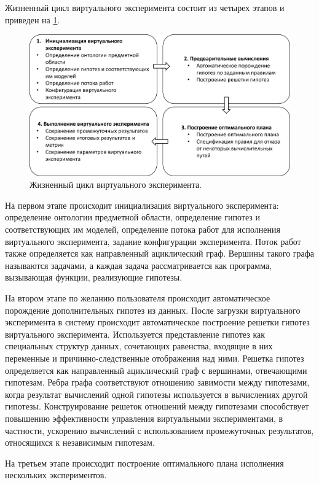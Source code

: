 Жизненный цикл виртуального эксперимента состоит из четырех этапов и приведен на \cref{fig:lifecycle_ve}. 
\begin{figure}[ht]
    \centering
    \includegraphics[width=1.0\linewidth]{images/ve_cycle.pdf}
    \caption{Жизненный цикл виртуального эксперимента.}\label{fig:lifecycle_ve}
\end{figure}

На первом этапе происходит инициализация виртуального эксперимента: определение онтологии предметной области, 
определение гипотез и соответствующих им моделей, определение потока работ для исполнения виртуального эксперимента, 
задание конфигурации эксперимента. Поток работ также определяется как направленный ациклический граф. Вершины такого 
графа называются задачами, а каждая задача рассматривается как программа, вызывающая функции, реализующие гипотезы.

На втором этапе по желанию пользователя происходит автоматическое порождение дополнительных гипотез из данных. 
После загрузки виртуального эксперимента в систему происходит автоматическое построение решетки гипотез виртуального 
эксперимента. Используется представление гипотез как специальных структур данных, сочетающих равенства, входящие в 
них переменные и причинно-следственные отображения над ними. Решетка гипотез определяется как направленный ациклический 
граф с вершинами, отвечающими гипотезам. Ребра графа соответствуют отношению завимости между гипотезами, когда 
результат вычислений одной гипотезы используется в вычислениях другой гипотезы. Конструирование решеток отношений 
между гипотезами способствует повышению эффективности управления виртуальными экспериментами, в частности, ускорению 
вычислений с использованием промежуточных результатов, относящихся к независимым гипотезам. 

На третьем этапе происходит построение оптимального плана исполнения нескольких экспериментов. 

